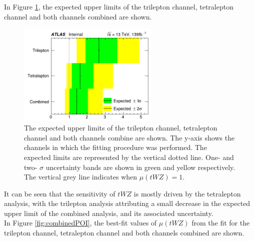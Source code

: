 In Figure \ref{fig:combinedlimits}, the expected upper limits of the trilepton channel, tetralepton channel and both channels combined are shown.
\begin{figure}
    \centering
    \includegraphics[width=0.6\textwidth]{figures/combined/Limits.png}
    \caption{The expected upper limits of the trilepton channel, tetralepton channel and both channels combine are shown. The y-axis shows the channels in which the fitting procedure was performed. The expected limits are represented by the vertical dotted line. One- and two- $\sigma$ uncertainty bands are shown in green and yellow respectively. The vertical grey line indicates when $\mu (tWZ) = 1$. }
    \label{fig:combinedlimits}
\end{figure}

It can be seen that the sensitivity of $tWZ$ is mostly driven by the tetralepton analysis, with the trilepton analysis attributing a small decrease in the expected upper limit of the combined analysis, and its associated uncertainty. \\

In Figure \ref{fig:combinedPOI}, the best-fit values of $\mu (tWZ)$ from the fit for the trilepton channel, tetralepton channel and both channels combined are shown.


